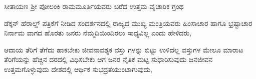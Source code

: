 \vspace{2.5pt plus 3pt minus 0.5pt}\noindent\hspace*{1.2em}\hspace{0.55em}ಸೀತಾಯಣ ಶ್ರೀ ಪೋಲಂಕಿ ರಾಮಮೂರ್ತಿಯವರು ಬರೆದ ಉತ್ತಮ ವೈಚಾರಿಕ ಗ್ರಂಥ\par

\vspace{2.5pt plus 3pt minus 0.5pt}\noindent\hspace*{1.2em}\hspace{0.55em}ಡೆಕ್ಕನ್‌ ಹೆರಾಲ್ಡ್‌ ಪತ್ರಿಕೆಗೆ ನೀಡಿದ ಸಂದರ್ಶನದಲ್ಲಿ ರಾಜ್ಯದ ಮುಖ್ಯ ಮಂತ್ರಿಯವರು ಹಿಂಸಾಚಾರ ಹಾಗೂ ಭ್ರಷ್ಟಾಚಾರ ನಿರ್ನಾಮ ವಾಗದ ಹೊರತು ಜನರು ನೆಮ್ಮದಿಯಿಂದಿರಲು ಸಾಧ್ಯವಿಲ್ಲ ಎಂದು ಹೇಳಿದರು,\par

\vspace{2.5pt plus 3pt minus 0.5pt}\noindent\hspace*{1.2em}\hspace{0.55em}ಆದಾಯ ತೆರಿಗೆ ತೆಗೆದು ಹಾಕಬೇಕು ಜೀವನಾವಶ್ಯಕ ವಸ್ತು ಗಳನ್ನು ಬಿಟ್ಟು ಉಳಿದೆಲ್ಲ ವಸ್ತುಗಳ ಮೇಲೂ ಮಾರಾಟ ತೆರಿಗೆಯನ್ನು ಹೆಚ್ಚಿನ ದರದಲ್ಲಿ ವಿಧಿಸಬೇಕು ಆಗ ಜನರ ನೈತಿಕ ಮಟ್ಟ ಸುಧಾರಿಸುವುದು ಜನಜೀವನ ಉತ್ತಮಗೊಳ್ಳುವುದು ದೇಶದಲ್ಲಿ ಆರ್ಥಿಕ ಸುಭದ್ರತೆಯುಂಟಾಗುವುದು,\par
